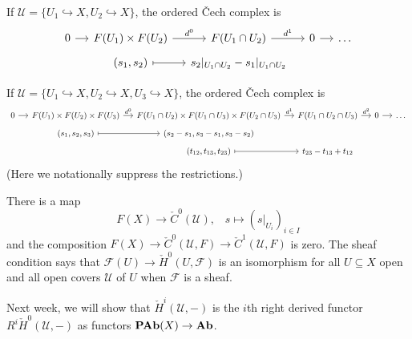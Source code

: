 \begin{exmp}
If \(\mathcal U=\{U_1\hookrightarrow X,U_2\hookrightarrow X\}\), the ordered Čech complex is
\begin{equation*}
  \begin{tikzcd}[row sep=tiny, column sep=small]
    0 \ar[r] & F(U_1) \times F(U_2) \ar[r, "d^0"] & F(U_1\cap U_2) \ar[r, "d^1"] & 0 \ar[r] & \ldots \\
    & {(s_1,s_2)} \ar[r, mapsto] & s_2|_{U_1\cap U_2}-s_1|_{U_1\cap U_2}
  \end{tikzcd}
\end{equation*}
\end{exmp}

\begin{exmp}
If \(\mathcal U=\{U_1\hookrightarrow X,U_2\hookrightarrow X,U_3\hookrightarrow X\}\), the ordered Čech complex is
\begin{equation*}
  \small
  \begin{tikzcd}[row sep=tiny, column sep=small]
    0 \ar[r] & F(U_1) \times F(U_2) \times F(U_3) \ar[r, "d^0"] & F(U_1\cap U_2) \times F(U_1\cap U_3) \times F(U_2\cap U_3) \ar[r, "d^1"] & F(U_1\cap U_2\cap U_3) \ar[r, "d^2"] & 0 \ar[r] & \ldots \\
    & {(s_1,s_2,s_3)} \ar[r, mapsto] & {(s_2-s_1,s_3-s_1,s_3-s_2)} \\
    & & {(t_{12},t_{13},t_{23})} \ar[r, mapsto] & t_{23}-t_{13}+t_{12}
  \end{tikzcd}
\end{equation*}
(Here we notationally suppress the restrictions.)
\end{exmp}

\begin{rmk}
There is a map
\[ F(X) \to \check{C}^0(\mathcal U)\text{,} \quad s\mapsto (s|_{U_i})_{i\in I} \]
and the composition \(F(X)\to\check{C}^0(\mathcal U,F)\to\check{C}^1(\mathcal U,F)\) is zero.
The sheaf condition says that \(\mathcal F(U)\to\check{H}^0(U,\mathcal F)\) is an isomorphism for all \(U\subseteq X\) open and all open covers \(\mathcal U\) of \(U\) when \(\mathcal F\) is a sheaf.
\end{rmk}

Next week, we will show that \(\check{H}^i(\mathcal U,-)\) is the \(i\)th right derived functor \(R^i\check{H}^0(\mathcal U,-)\) as functors \(\operatorname{\mathbf{PAb}}(X)\to\mathbf{Ab}\).

